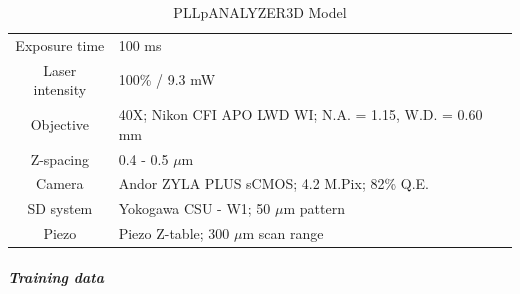 \documentclass[11pt,singlespacinge,twoside]{reedthesis} %
\begin{document}
\begin{longtable}[]{@{}cl@{}}
\caption{\label{tab:imgcond3DGrT} PLLpANALYZER3D Model}\tabularnewline
\toprule
\endhead
\begin{minipage}[t]{0.23\columnwidth}\centering
Exposure time\strut
\end{minipage} & \begin{minipage}[t]{0.71\columnwidth}\raggedright
100 ms\strut
\end{minipage}\tabularnewline
\begin{minipage}[t]{0.23\columnwidth}\centering
Laser intensity\strut
\end{minipage} & \begin{minipage}[t]{0.71\columnwidth}\raggedright
100\% / 9.3 mW\strut
\end{minipage}\tabularnewline
\begin{minipage}[t]{0.23\columnwidth}\centering
Objective\strut
\end{minipage} & \begin{minipage}[t]{0.71\columnwidth}\raggedright
40X; Nikon CFI APO LWD WI; N.A. = 1.15, W.D. = 0.60 mm\strut
\end{minipage}\tabularnewline
\begin{minipage}[t]{0.23\columnwidth}\centering
Z-spacing\strut
\end{minipage} & \begin{minipage}[t]{0.71\columnwidth}\raggedright
0.4 - 0.5 \(\mu\)m\strut
\end{minipage}\tabularnewline
\begin{minipage}[t]{0.23\columnwidth}\centering
Camera\strut
\end{minipage} & \begin{minipage}[t]{0.71\columnwidth}\raggedright
Andor ZYLA PLUS sCMOS; 4.2 M.Pix; 82\% Q.E.\strut
\end{minipage}\tabularnewline
\begin{minipage}[t]{0.23\columnwidth}\centering
SD system\strut
\end{minipage} & \begin{minipage}[t]{0.71\columnwidth}\raggedright
Yokogawa CSU - W1; 50 \(\mu\)m pattern\strut
\end{minipage}\tabularnewline
\begin{minipage}[t]{0.23\columnwidth}\centering
Piezo\strut
\end{minipage} & \begin{minipage}[t]{0.71\columnwidth}\raggedright
Piezo Z-table; 300 \(\mu\)m scan range\strut
\end{minipage}\tabularnewline
\bottomrule
\end{longtable}
\hypertarget{training-data-1}{%
\subparagraph{Training data}\label{training-data-1}}
\end{document}
